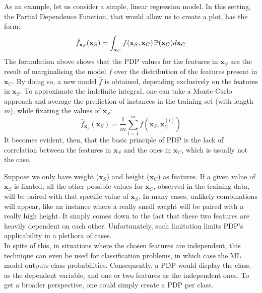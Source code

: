 As an example, let us consider a simple, linear regression model. In this setting, the Partial Dependence Function, that would allow us to create a plot, has the form:
\begin{equation}
    \hat{f}_{\mathbf{x}_{S}}(\mathbf{x}_{S}) = \int_{\mathbf{x}_{C}}^{}
    f(\mathbf{x}_{S},\mathbf{x}_{C}) \operatorname{\mathbb{P}} (\mathbf{x}_{C}) d \mathbf{x}_{C}
    \label{eq:3}
\end{equation}
The formulation above shows that the \ac{PDP} values for the features in $\mathbf{x}_{S}$ are the result of marginalising the model $f$ over the distribution of the features present in $\mathbf{x}_{C}$. By doing so, a new model $\hat{f}$ is obtained, depending exclusively on the features in $\mathbf{x}_{S}$. To approximate the indefinite integral, one can take a Monte Carlo approach and average the prediction of instances in the training set (with length $m$), while fixating the values of $\mathbf{x}_{S}$:
\begin{equation}
    \hat{f}_{\mathbf{x}_{S}}(\mathbf{x}_{S}) = \frac{1}{m} \sum^{m}_{i=1}f(\mathbf{x}_{S},\mathbf{x}_{C}^{(i)})
    \label{eq:4}
\end{equation}
It becomes evident, then, that the basic principle of \ac{PDP} is the lack of correlation between the features in $\mathbf{x}_{S}$ and the ones in $\mathbf{x}_{C}$, which is usually not the case.

Suppose we only have weight ($\mathbf{x}_{S}$) and height ($\mathbf{x}_{C}$) as features. If a given value of $\mathbf{x}_{S}$ is fixated, all the other possible values for $\mathbf{x}_{C}$, observed in the training data, will be paired with that specific value of $\mathbf{x}_{S}$. In many cases, unlikely combinations will appear, like an instance where a really small weight will be paired with a really high height. It simply comes down to the fact that these two features are heavily dependent on each other. Unfortunately, such limitation limits \ac{PDP}'s applicability in a plethora of cases.\\

In spite of this, in situations where the chosen features are independent, this technique can even be used for classification problems, in which case the \ac{ML} model outputs class probabilities. Consequently, a \ac{PDP} would display the class, as the dependent variable, and one or two features as the independent ones. To get a broader perspective, one could simply create a \ac{PDP} per class.\\

